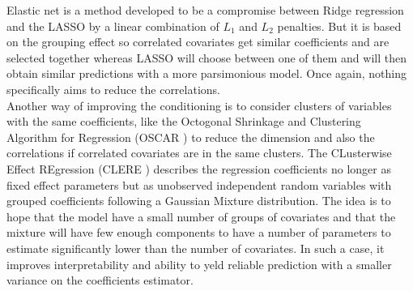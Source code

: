 \documentclass[11pt,a4paper]{article}
\begin{document}
	Elastic net \cite{zou2005regularization} is a method developed to be a compromise between Ridge regression and the \textsc{LASSO} by a linear combination of $L_1$ and $L_2$ penalties.
	But it is based on the grouping effect so correlated covariates get similar coefficients and are selected together whereas LASSO will choose between one of them and will then obtain similar predictions with a more parsimonious model. Once again, nothing specifically aims to reduce the correlations. %
	\\
	
	Another way of improving the conditioning is to consider clusters of variables with the same coefficients, like the Octogonal Shrinkage and Clustering Algorithm for Regression (\textsc{OSCAR} \cite{bondell2008simultaneous}) to reduce the dimension and also the correlations if correlated covariates are in the same clusters.
	The CLusterwise Effect REgression (\textsc{CLERE} \cite{yengo2012variable}) describes the regression coefficients no longer as fixed effect parameters but as unobserved independent random variables with grouped coefficients following a Gaussian Mixture distribution. The idea is to hope that the model have a small number of groups of covariates and that the mixture will have few enough components to have a number of parameters to estimate significantly lower than the number of covariates. In such a case, it improves interpretability and ability to yeld reliable prediction with a smaller variance on the coefficients estimator. 
	
\end{document}
